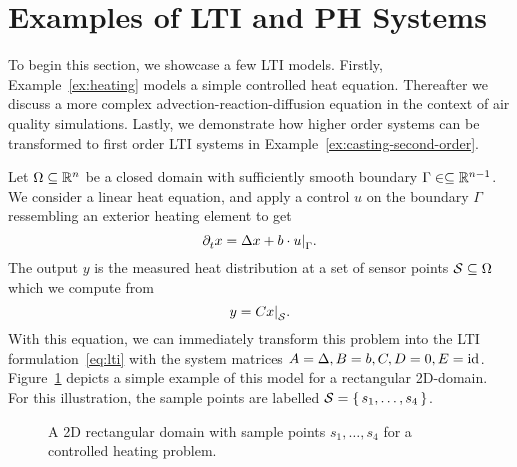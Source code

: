 \section{Examples of \texorpdfstring{\ac{LTI}}{LTI} and \texorpdfstring{\ac{PH}}{PH} Systems}

To begin this section, we showcase a few \ac{LTI} models.
Firstly, Example~\ref{ex:heating} models a simple controlled heat equation.
Thereafter we discuss a more complex advection-reaction-diffusion equation in the context of air quality simulations.
Lastly, we demonstrate how higher order systems can be transformed to first order \ac{LTI} systems in Example~\ref{ex:casting-second-order}.

\begin{example}\label{ex:heating}
    Let $\Omega \subseteq \mathbb{R}^n$ be a closed domain with sufficiently smooth boundary $\Gamma \in \subseteq \mathbb{R}^{n - 1}$.
    We consider a linear heat equation, and apply a control $u$ on the boundary $\Gamma$ ressembling an exterior heating element to get
    \begin{equation*}
        \pd[t]{} x = \lapl{x} + b \cdot \res{u}{\Gamma}.
    \end{equation*}
    The output $y$ is the measured heat distribution at a set of sensor points $\mathcal{S} \subseteq \Omega$ which we compute from
    \begin{equation*}
        y = C \res{x}{\mcl{S}}.
    \end{equation*}
    With this equation, we can immediately transform this problem into the \ac{LTI} formulation~\eqref{eq:lti} with the system matrices $A = \mathop{}\!\Delta{}, B = b, C, D = 0, E = \text{id}_{}$.
    Figure~\ref{fig:lti-heating} depicts a simple example of this model for a rectangular 2D-domain.
    For this illustration, the sample points are labelled $\mathcal{S} = \left\{\,s_1, \dots, s_4\,\right\}$.

    \begin{figure}[h]
        \centering
        \caption{A 2D rectangular domain with sample points $s_1, \dots, s_4$ for a controlled heating problem.}%
        \label{fig:lti-heating}
    \end{figure}
\end{example}

